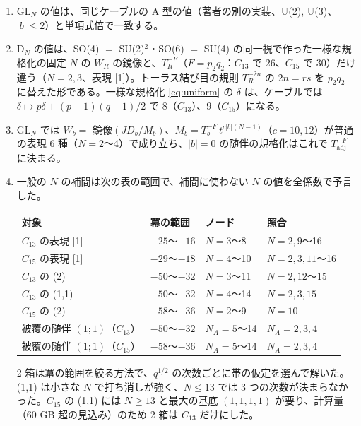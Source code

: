 \begin{compresult}[ケーブルの規格化と一般の $N$]\label{cr:cable-interp}
\begin{enumerate}
\item GL$_N$ の値は、同じケーブルの A 型の値（著者の別の実装、U(2), U(3)、$|b| \le 2$）と単項式倍で一致する。
\item D$_N$ の値は、SO(4) $=$ SU(2)$^2$・SO(6) $=$ SU(4) の同一視で作った一様な規格化の固定 $N$ の $W_R$ の鏡像と、$T_R^{-F}$（$F = p_2q_2$：$C_{13}$ で 26、$C_{15}$ で 30）だけ違う（$N = 2, 3$、表現 [1]）。トーラス結び目の規則 $T_R^{-2n}$ の $2n = rs$ を $p_2q_2$ に替えた形である。一様な規格化 \eqref{eq:uniform} の $\delta$ は、ケーブルでは $\delta \mapsto p\delta + (p-1)(q-1)/2$ で $8$（$C_{13}$）、$9$（$C_{15}$）になる。
\item GL$_N$ では $W_b = $ 鏡像$(JD_b/M_b)$、$M_b = T_b^{-F}\,t^{c|b|(N-1)}$（$c = 10, 12$）が普通の表現 6 種（$N = 2$〜4）で成り立ち、$|b| = 0$ の随伴の規格化はこれで $T_{\mathrm{adj}}^{-F}$ に決まる。
\item 一般の $N$ の補間は次の表の範囲で、補間に使わない $N$ の値を全係数で予言した。
\begin{center}
\footnotesize
\begin{tabular}{llll}
\toprule
対象 & 冪の範囲 & ノード & 照合 \\
\midrule
$C_{13}$ の表現 [1] & $-25$〜$-16$ & $N = 3$〜8 & $N = 2, 9$〜16 \\
$C_{15}$ の表現 [1] & $-29$〜$-18$ & $N = 4$〜10 & $N = 2, 3, 11$〜16 \\
$C_{13}$ の (2) & $-50$〜$-32$ & $N = 3$〜11 & $N = 2, 12$〜15 \\
$C_{13}$ の (1,1) & $-50$〜$-32$ & $N = 4$〜14 & $N = 2, 3, 15$ \\
$C_{15}$ の (2) & $-58$〜$-36$ & $N = 2$〜9 & $N = 10$ \\
被覆の随伴 $(1;1)$（$C_{13}$） & $-50$〜$-32$ & $N_A = 5$〜14 & $N_A = 2, 3, 4$ \\
被覆の随伴 $(1;1)$（$C_{15}$） & $-58$〜$-36$ & $N_A = 5$〜14 & $N_A = 2, 3, 4$ \\
\bottomrule
\end{tabular}
\end{center}
2 箱は冪の範囲を絞る方法で、$q^{1/2}$ の次数ごとに帯の仮定を選んで解いた。(1,1) は小さな $N$ で打ち消しが強く、$N \le 13$ では 3 つの次数が決まらなかった。$C_{15}$ の (1,1) には $N \ge 13$ と最大の基底 $(1,1,1,1)$ が要り、計算量（60 GB 超の見込み）のため 2 箱は $C_{13}$ だけにした。
\end{enumerate}
\end{compresult}

